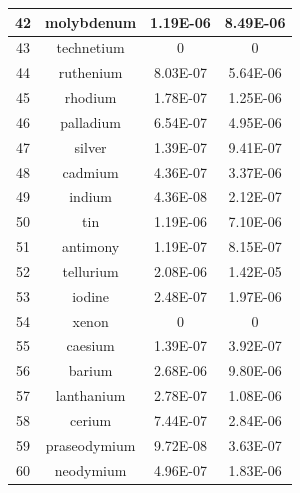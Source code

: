 \documentclass[a4paper]{article}
\begin{document}
\begin{center}
\begin{tabular}{|c|c|c|c|}
			\hline
			42 & molybdenum & 1.19E-06 & 8.49E-06 \\
			\hline
			43 & technetium & 0 & 0 \\
			\hline
			44 & ruthenium & 8.03E-07 & 5.64E-06 \\
			\hline
			45 & rhodium & 1.78E-07 & 1.25E-06 \\
			\hline
			46 & palladium & 6.54E-07 & 4.95E-06 \\
			\hline
			47 & silver & 1.39E-07 & 9.41E-07 \\
			\hline
			48 & cadmium & 4.36E-07 & 3.37E-06 \\
			\hline
			49 & indium & 4.36E-08 & 2.12E-07 \\
			\hline
			50 & tin & 1.19E-06 & 7.10E-06 \\
			\hline
			51 & antimony & 1.19E-07 & 8.15E-07 \\
			\hline
			52 & tellurium & 2.08E-06 & 1.42E-05 \\
			\hline
			53 & iodine & 2.48E-07 & 1.97E-06 \\
			\hline
			54 & xenon & 0 & 0 \\
			\hline
			55 & caesium & 1.39E-07 & 3.92E-07 \\
			\hline
			56 & barium & 2.68E-06 & 9.80E-06 \\
			\hline
			57 & lanthanium & 2.78E-07 & 1.08E-06 \\
			\hline
			58 & cerium & 7.44E-07 & 2.84E-06 \\
			\hline
			59 & praseodymium & 9.72E-08 & 3.63E-07 \\
			\hline
			60 & neodymium & 4.96E-07 & 1.83E-06 \\
			\hline
		\end{tabular}
	\end{center}
	
\end{document}
